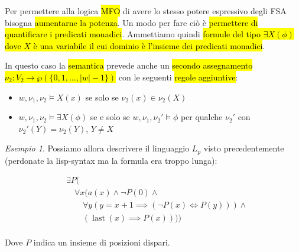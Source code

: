 \documentclass[a4paper,11pt,oneside]{article}
\theoremstyle{plain}
\theoremstyle{definition}
\theoremstyle{remark}
\newtheorem{esempio}{Esempio}[section]
\DeclareMathOperator{\last}{last}
\begin{document}
Per permettere alla logica \hl{MFO} di avere lo stesso potere espressivo degli
FSA bisogna \hl{aumentarne la potenza}. Un modo per fare ciò è \hl{permettere di
quantificare i predicati monadici}. Ammettiamo quindi \hl{formule del tipo
$\exists X(\phi)$ dove $X$ è una variabile il cui dominio è l'insieme dei
predicati monadici}.

In questo caso la \hl{semantica} prevede anche un \hl{secondo assegnamento}
\hl{$\nu_2: V_2 \to \wp(\{0,1,\ldots,|w|-1\})$} con le seguenti \hl{regole
aggiuntive}:

\begin{itemize}
  \item $w, \nu_1, \nu_2 \models X(x)$ se solo se $\nu_2(x) \in \nu_2(X)$
  \item $w, \nu_1, \nu_2 \models \exists X(\phi)$ se e solo se
    $w, \nu_1, \nu_2' \models \phi$ per qualche
    $\nu_2'$ con $\nu_2'(Y) = \nu_2(Y)$, $Y \neq X$
\end{itemize}

\begin{esempio}
  Possiamo allora descrivere il linguaggio $L_p$ visto precedentemente
  (perdonate la lisp-syntax ma la formula era troppo lunga):

  \begin{align*}
    & \exists P( \\
    &   \quad \forall x(a(x) \land \neg P(0) \land \\
    &   \quad \quad \forall y (y = x+1 \implies (\neg P(x) \iff P(y))) \land \\
    &   \quad \quad (\last(x) \implies P(x)))) \\
  \end{align*}

  Dove $P$ indica un insieme di posizioni dispari.
\end{esempio}
\end{document}
